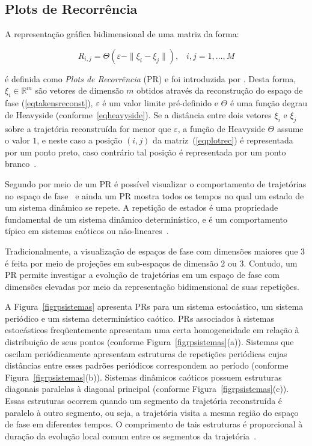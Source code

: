 \subsection{Plots de Recorrência}

A representação gráfica bidimensional de uma matriz da forma:

\begin{equation}
R_{i,j}=\Theta(\varepsilon-\|\xi_{i}-\xi_{j}\|),\;\;\; i,j=1,\ldots,M
\label{eqplotrec}
\end{equation}

é definida como \textit{Plots de Recorrência} (PR) e foi introduzida por . Desta forma, $\xi_{i}\in\mathds{R}^m$ são vetores de dimensão $m$ obtidos através da reconstrução do espaço de fase (\ref{eqtakensreconst}), $\varepsilon$ é um valor limite pré-definido e $\Theta$ é uma função degrau de Heavyside (conforme~\ref{eqheavyside}). Se a distância entre dois vetores $\xi_{i}$ e $\xi_{j}$ sobre a trajetória reconstruída for menor que $\varepsilon$, a função de Heavyside $\Theta$ assume o valor $1$, e neste caso a posição $(i,j)$ da matriz~(\ref{eqplotrec}) é representada por um ponto preto, caso contrário tal posição é representada por um ponto branco~\cite{eckmannplotrecorr/87,thielromano/04,thielemuitos/02,gaocai/00}.

Segundo  por meio de um PR é possível visualizar o comportamento de trajetórias no espaço de fase~\cite{eckmannplotrecorr/87} e ainda um PR mostra todos os tempos no qual um estado de um sistema dinâmico se repete. A repetição de estados é uma propriedade fundamental de um sistema dinâmico determinístico, e é um comportamento típico em sistemas caóticos ou não-lineares~\cite{thieltese/04}. 

Tradicionalmente, a visualização de espaços de fase com dimensões maiores que $3$ é feita por meio de projeções em sub-espaços de dimensão $2$ ou $3$. Contudo, um PR permite investigar a evolução de trajetórias em um espaço de fase com dimensões elevadas por meio da representação bidimensional de suas repetições. 

A Figura~\ref{figrpsistemas} apresenta PRs para um sistema estocástico, um sistema periódico e um sistema determinístico caótico. PRs associados à sistemas estocásticos freqüentemente apresentam uma certa homogeneidade em relação à distribuição de seus pontos (conforme Figura~\ref{figrpsistemas}(a)). Sistemas que oscilam periódicamente apresentam estruturas de repetições periódicas cujas distâncias entre esses padrões periódicos correspondem ao período (conforme Figura~\ref{figrpsistemas}(b)). Sistemas dinâmicos caóticos possuem estruturas diagonais paralelas à diagonal principal (conforme Figura~\ref{figrpsistemas}(c)). Essas estruturas ocorrem quando um segmento da trajetória reconstruída é paralelo à outro segmento, ou seja, a trajetória visita a mesma região do espaço de fase em diferentes tempos. O comprimento de tais estruturas é proporcional à duração da evolução local comum entre os segmentos da trajetória~\cite{thieltese/04,gaocai/00}.

